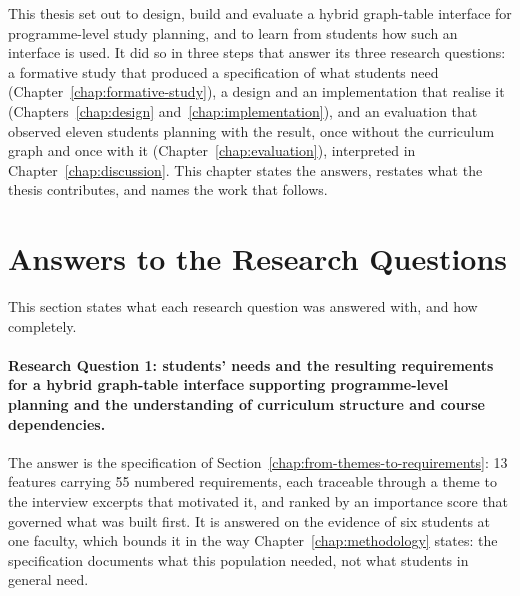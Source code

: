 \label{chap:conclusion}

This thesis set out to design, build and evaluate a hybrid graph-table interface for programme-level study planning, and to learn from students how such an interface is used. It did so in three steps that answer its three research questions: a formative study that produced a specification of what students need (Chapter~\ref{chap:formative-study}), a design and an implementation that realise it (Chapters~\ref{chap:design} and~\ref{chap:implementation}), and an evaluation that observed eleven students planning with the result, once without the curriculum graph and once with it (Chapter~\ref{chap:evaluation}), interpreted in Chapter~\ref{chap:discussion}. This chapter states the answers, restates what the thesis contributes, and names the work that follows.

\section{Answers to the Research Questions}
\label{sec:concl-rq-answers}

This section states what each research question was answered with, and how completely.

\paragraph{Research Question 1: students' needs and the resulting requirements for a hybrid graph-table interface supporting programme-level planning and the understanding of curriculum structure and course dependencies.}
The answer is the specification of Section~\ref{chap:from-themes-to-requirements}: 13 features carrying 55 numbered requirements, each traceable through a theme to the interview excerpts that motivated it, and ranked by an importance score that governed what was built first. It is answered on the evidence of six students at one faculty, which bounds it in the way Chapter~\ref{chap:methodology} states: the specification documents what this population needed, not what students in general need.

